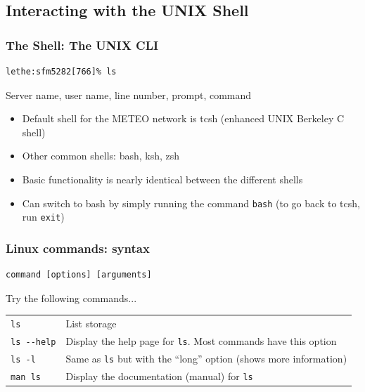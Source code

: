 \documentclass[hyperref,pdfa,unicode,utf8,usepdftitle]{beamer}
\begin{document}
\subsection{Interacting with the UNIX Shell}

\begin{frame}[fragile]
  \frametitle{The Shell: The UNIX CLI}
\begin{lstlisting}
lethe:sfm5282[766]% ls
\end{lstlisting}
  Server name, user name, line number, prompt, command
  \begin{itemize}
  \item Default shell for the METEO network is tcsh (enhanced UNIX
    Berkeley C shell)
  \item Other common shells: bash, ksh, zsh
  \item Basic functionality is nearly identical between the different
    shells
  \item Can switch to bash by simply running the
    command \lstinline{bash} (to go back to tcsh,
    run \lstinline{exit})
  \end{itemize}
\end{frame}

\begin{frame}[fragile]
  \frametitle{Linux commands: syntax}
\begin{lstlisting}
command [options] [arguments]
\end{lstlisting}

  Try the following commands...
  \begin{tabular}{lp{3in}}
    \texttt{ls} & List storage \\
    \texttt{ls -{}-help} & Display the help page for \texttt{ls}. Most commands have this option \\
    \texttt{ls -l} & Same as \texttt{ls} but with the “long” option (shows more information) \\
    \texttt{man ls} & Display the documentation (manual) for \texttt{ls}
  \end{tabular}
\end{frame}
\end{document}
